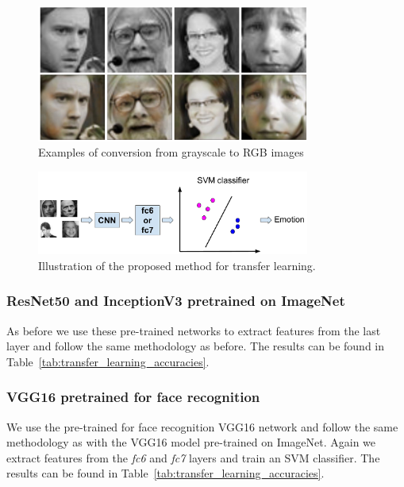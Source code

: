 \begin{figure}[]
    \begin{center}
    \includegraphics[width=0.8\textwidth]{images/gray_rgb.pdf}
    \end{center}
    \caption{Examples of conversion from grayscale to RGB images} \label{fig:gray_rgb.pdf}
\end{figure}

\begin{figure}[H]
    \begin{center}
    \includegraphics[width=0.8\textwidth]{images/SVM_fc6_fc7.pdf}
    \end{center}
    \caption{Illustration of the proposed method for transfer learning.} \label{fig:SVM_fc6_fc7.pdf}
\end{figure}


\subsubsection{ResNet50 and InceptionV3 pretrained on ImageNet}
As before we use these pre-trained networks to extract features from the last layer and follow the same methodology as before. The results can be found in Table~\ref{tab:transfer_learning_accuracies}.


\subsubsection{VGG16 pretrained for face recognition}
We use the pre-trained for face recognition VGG16 network and follow the same methodology as with the VGG16 model pre-trained on ImageNet. Again we extract features from the \textit{fc6} and \textit{fc7} layers and train an SVM classifier. The results can be found in Table~\ref{tab:transfer_learning_accuracies}.

